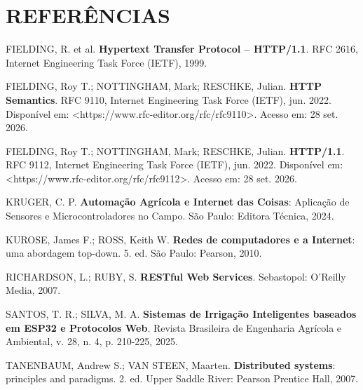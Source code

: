 \section*{REFERÊNCIAS}

\begin{singlespace}
\noindent FIELDING, R. et al. \textbf{Hypertext Transfer Protocol -- HTTP/1.1}. RFC 2616, Internet Engineering Task Force (IETF), 1999.

\vspace{0.8em}
\noindent FIELDING, Roy T.; NOTTINGHAM, Mark; RESCHKE, Julian. \textbf{HTTP Semantics}. RFC 9110, Internet Engineering Task Force (IETF), jun. 2022. Disponível em: <https://www.rfc-editor.org/rfc/rfc9110>. Acesso em: 28 set. 2026.

\vspace{0.8em}
\noindent FIELDING, Roy T.; NOTTINGHAM, Mark; RESCHKE, Julian. \textbf{HTTP/1.1}. RFC 9112, Internet Engineering Task Force (IETF), jun. 2022. Disponível em: <https://www.rfc-editor.org/rfc/rfc9112>. Acesso em: 28 set. 2026.

\vspace{0.8em}
\noindent KRUGER, C. P. \textbf{Automação Agrícola e Internet das Coisas}: Aplicação de Sensores e Microcontroladores no Campo. São Paulo: Editora Técnica, 2024.

\vspace{0.8em}
\noindent KUROSE, James F.; ROSS, Keith W. \textbf{Redes de computadores e a Internet}: uma abordagem top-down. 5. ed. São Paulo: Pearson, 2010.

\vspace{0.8em}
\noindent RICHARDSON, L.; RUBY, S. \textbf{RESTful Web Services}. Sebastopol: O'Reilly Media, 2007.

\vspace{0.8em}
\noindent SANTOS, T. R.; SILVA, M. A. \textbf{Sistemas de Irrigação Inteligentes baseados em ESP32 e Protocolos Web}. Revista Brasileira de Engenharia Agrícola e Ambiental, v. 28, n. 4, p. 210-225, 2025.

\vspace{0.8em}
\noindent TANENBAUM, Andrew S.; VAN STEEN, Maarten. \textbf{Distributed systems}: principles and paradigms. 2. ed. Upper Saddle River: Pearson Prentice Hall, 2007.
\end{singlespace}
